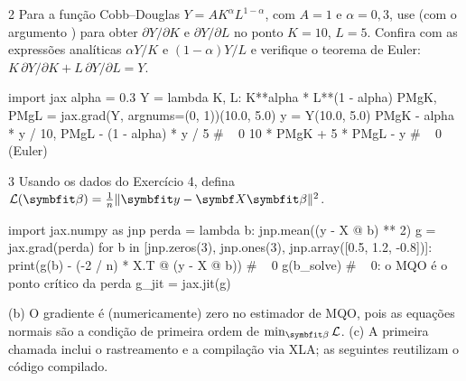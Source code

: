 \documentclass[lista]{tmlnotas}
\begin{document}
\begin{exercicio}{2}
Para a função Cobb--Douglas $Y = A K^{\alpha} L^{1-\alpha}$, com $A = 1$ e
$\alpha = 0{,}3$, use  (com o argumento ) para obter
$\partial Y/\partial K$ e $\partial Y/\partial L$ no ponto $K = 10$, $L = 5$.
Confira com as expressões analíticas $\alpha Y/K$ e $(1-\alpha)Y/L$ e verifique
o teorema de Euler: $K\,\partial Y/\partial K + L\,\partial Y/\partial L = Y$.
\end{exercicio}
\begin{solucao}
\begin{codigo}
import jax
alpha = 0.3
Y = lambda K, L: K**alpha * L**(1 - alpha)
PMgK, PMgL = jax.grad(Y, argnums=(0, 1))(10.0, 5.0)
y = Y(10.0, 5.0)
PMgK - alpha * y / 10, PMgL - (1 - alpha) * y / 5   # ~ 0
10 * PMgK + 5 * PMgL - y                            # ~ 0 (Euler)
\end{codigo}
\end{solucao}

\begin{exercicio}{3}
Usando os dados do Exercício 4, defina $\loss(\vbeta) = \frac1n\norm{\vy-\mX\vbeta}^2$.
\end{exercicio}
\begin{solucao}
\begin{codigo}
import jax.numpy as jnp
perda = lambda b: jnp.mean((y - X @ b) ** 2)
g = jax.grad(perda)
for b in [jnp.zeros(3), jnp.ones(3), jnp.array([0.5, 1.2, -0.8])]:
    print(g(b) - (-2 / n) * X.T @ (y - X @ b))     # ~ 0
g(b_solve)        # ~ 0: o MQO é o ponto crítico da perda
g_jit = jax.jit(g)
\end{codigo}
(b) O gradiente é (numericamente) zero no estimador de MQO, pois as equações
normais são a condição de primeira ordem de $\min_{\vbeta}\loss$. (c) A primeira
chamada inclui o rastreamento e a compilação via XLA; as seguintes reutilizam o
código compilado.
\end{solucao}
\end{document}

